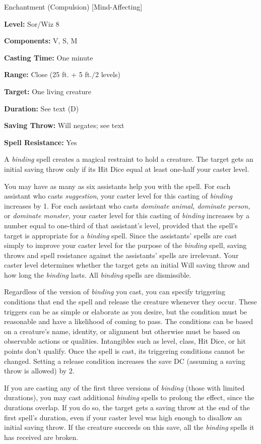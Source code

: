 \documentclass{article}
\begin{document}
Enchantment (Compulsion) [Mind-Affecting]

\textbf{Level:} Sor/Wiz 8

\textbf{Components:} V, S, M

\textbf{Casting Time:} One minute

\textbf{Range:} Close (25 ft. + 5 ft./2 levels)

\textbf{Target:} One living creature

\textbf{Duration:} See text (D)

\textbf{Saving Throw: }Will negates; see text

\textbf{Spell Resistance:} Yes

A \textit{binding }spell creates a magical restraint to hold a creature. The target 
gets an initial saving throw only if its Hit Dice equal at least one-half your 
caster level.

You may have as many as six assistants help you with the spell. For each assistant 
who casts \textit{suggestion}, your caster level for this casting of \textit{binding 
}increases by 1. For each assistant who casts \textit{dominate animal, dominate 
person, }or \textit{dominate monster, }your caster level for this casting of \textit{binding 
}increases by a number equal to one-third of that assistant's level, provided that 
the spell's target is appropriate for a \textit{binding }spell. Since the assistants' 
spells are cast simply to improve your caster level for the purpose of the \textit{binding 
}spell, saving throws and spell resistance against the assistants' spells are irrelevant. 
Your caster level determines whether the target gets an initial Will saving throw 
and how long the \textit{binding }lasts. All \textit{binding }spells are dismissible.

Regardless of the version of \textit{binding }you cast, you can specify triggering 
conditions that end the spell and release the creature whenever they occur. These 
triggers can be as simple or elaborate as you desire, but the condition must be 
reasonable and have a likelihood of coming to pass. The conditions can be based 
on a creature's name, identity, or alignment but otherwise must be based on observable 
actions or qualities. Intangibles such as level, class, Hit Dice, or hit points 
don't qualify. Once the spell is cast, its triggering conditions cannot be changed. 
Setting a release condition increases the save DC (assuming a saving throw is allowed) 
by 2.

If you are casting any of the first three versions of \textit{binding }(those with 
limited durations), you may cast additional \textit{binding }spells to prolong 
the effect, since the durations overlap. If you do so, the target gets a saving 
throw at the end of the first spell's duration, even if your caster level was high 
enough to disallow an initial saving throw. If the creature succeeds on this save, 
all the \textit{binding }spells it has received are broken.
\end{document}
